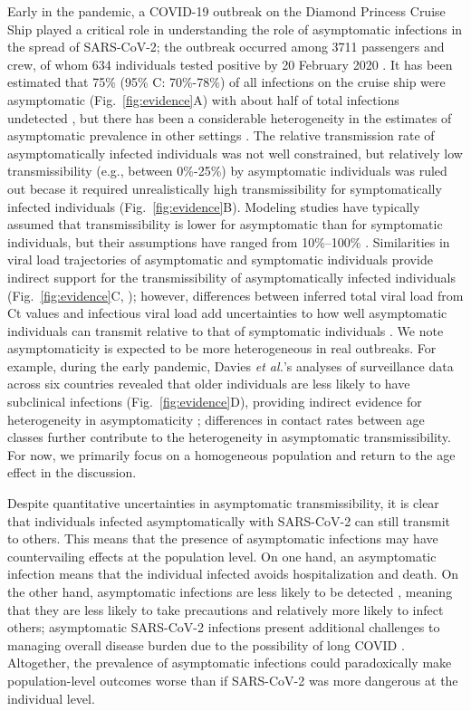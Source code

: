 \documentclass[12pt]{article}
\newcommand{\fref}[1]{Fig.~\ref{fig:#1}}
\begin{document}
Early in the pandemic, a COVID-19 outbreak on the Diamond Princess Cruise Ship played a critical role in understanding the role of asymptomatic infections in the spread of SARS-CoV-2;
the outbreak occurred among 3711 passengers and crew, of whom 634 individuals tested positive by 20 February 2020 \citep{mizumoto2020estimating}.
It has been estimated that 75\% (95\% C: 70\%-78\%) of all infections on the cruise ship were asymptomatic (\fref{evidence}A) with about half of total infections undetected \citep{emery2020}, but there has been a considerable heterogeneity in the estimates of asymptomatic prevalence in other settings \citep{alene2021magnitude}.
The relative transmission rate of asymptomatically infected individuals was not well constrained, but relatively low transmissibility (e.g., between 0\%-25\%) by asymptomatic individuals was ruled out becase it required unrealistically high transmissibility for symptomatically infected individuals (\fref{evidence}B).
Modeling studies have typically assumed that transmissibility is lower for asymptomatic than for symptomatic individuals, but their assumptions have ranged from 10\%--100\% \citep{ferretti2020quantifying,lavezzo2020}.
Similarities in viral load trajectories of asymptomatic and symptomatic individuals provide indirect support for the transmissibility of asymptomatically infected individuals (\fref{evidence}C, \citep{Kissler2020}); 
however, differences between inferred total viral load from Ct values and infectious viral load add uncertainties to how well asymptomatic individuals can transmit relative to that of symptomatic individuals \citep{romero2021ct}.
We note asymptomaticity is expected to be more heterogeneous in real outbreaks.
For example, during the early pandemic, Davies \textit{et al.}'s analyses of surveillance data across six countries revealed that older individuals are less likely to have subclinical infections (\fref{evidence}D), providing indirect evidence for heterogeneity in asymptomaticity \cite{davies2020};
differences in contact rates between age classes further contribute to the heterogeneity in asymptomatic transmissibility.
For now, we primarily focus on a homogeneous population and return to the age effect in the discussion.

Despite quantitative uncertainties in asymptomatic transmissibility, it is clear that individuals infected asymptomatically with SARS-CoV-2 can still transmit to others. 
This means that the presence of asymptomatic infections may have countervailing effects at the population level. 
On one hand, an asymptomatic infection means that the individual infected avoids hospitalization and death. 
On the other hand, asymptomatic infections are less likely to be detected \citep{fraser2004factors}, meaning that they are less likely to take precautions and relatively more likely to infect others;
asymptomatic SARS-CoV-2 infections present additional challenges to managing overall disease burden due to the possibility of long COVID \citep{xie2022long}.
Altogether, the prevalence of asymptomatic infections could paradoxically make population-level outcomes worse than if SARS-CoV-2 was more dangerous at the individual level.
\end{document}
